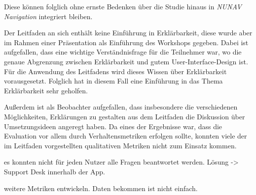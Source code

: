 Diese können folglich ohne ernste Bedenken über die Studie hinaus in \textit{NUNAV Navigation} integriert bleiben.

Der Leitfaden an sich enthält keine Einführung in Erklärbarkeit, diese wurde aber im Rahmen einer Präsentation als Einführung des Workshops gegeben. Dabei ist aufgefallen, dass eine wichtige Verständnisfrage für die Teilnehmer war, wo die genaue Abgrenzung zwischen Erklärbarkeit und gutem User-Interface-Design ist. Für die Anwendung des Leitfadens wird dieses Wissen über Erklärbarkeit vorausgesetzt. Folglich hat in diesem Fall eine Einführung in das Thema Erklärbarkeit sehr geholfen.

Außerdem ist als Beobachter aufgefallen, dass insbesondere die verschiedenen Möglichkeiten, Erklärungen zu gestalten aus dem Leitfaden die Diskussion über Umsetzungsideen angeregt haben. Da eines der Ergebnisse war, dass die Evaluation vor allem durch Verhaltensmetriken erfolgen sollte, konnten viele der im Leitfaden vorgestellten qualitativen Metriken nicht zum Einsatz kommen.

es konnten nicht für jeden Nutzer alle Fragen beantwortet werden. Lösung -> Support Desk innerhalb der App.

weitere Metriken entwickeln. Daten bekommen ist nicht einfach.